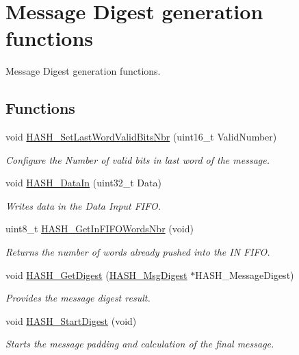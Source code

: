 \hypertarget{group___h_a_s_h___group2}{}\section{Message Digest generation functions}
\label{group___h_a_s_h___group2}


Message Digest generation functions.  


\subsection*{Functions}
\begin{DoxyCompactItemize}
\item 
void \hyperlink{group___h_a_s_h___group2_gac4d1fa51c9240ad0287b371564b5d2a6}{H\+A\+S\+H\+\_\+\+Set\+Last\+Word\+Valid\+Bits\+Nbr} (uint16\+\_\+t Valid\+Number)
\begin{DoxyCompactList}\small\item\em Configure the Number of valid bits in last word of the message. \end{DoxyCompactList}\item 
void \hyperlink{group___h_a_s_h___group2_ga9c4c0cebdeb1ce2631dd2eeab82107ef}{H\+A\+S\+H\+\_\+\+Data\+In} (uint32\+\_\+t Data)
\begin{DoxyCompactList}\small\item\em Writes data in the Data Input F\+I\+F\+O. \end{DoxyCompactList}\item 
uint8\+\_\+t \hyperlink{group___h_a_s_h___group2_ga37bec5e637a57124f3179185d03537ab}{H\+A\+S\+H\+\_\+\+Get\+In\+F\+I\+F\+O\+Words\+Nbr} (void)
\begin{DoxyCompactList}\small\item\em Returns the number of words already pushed into the I\+N F\+I\+F\+O. \end{DoxyCompactList}\item 
void \hyperlink{group___h_a_s_h___group2_ga23018d770837d6ab9f46941f105cc017}{H\+A\+S\+H\+\_\+\+Get\+Digest} (\hyperlink{struct_h_a_s_h___msg_digest}{H\+A\+S\+H\+\_\+\+Msg\+Digest} $\ast$H\+A\+S\+H\+\_\+\+Message\+Digest)
\begin{DoxyCompactList}\small\item\em Provides the message digest result. \end{DoxyCompactList}\item 
void \hyperlink{group___h_a_s_h___group2_ga84ac2b64179fd37b75c4d5f665126e93}{H\+A\+S\+H\+\_\+\+Start\+Digest} (void)
\begin{DoxyCompactList}\small\item\em Starts the message padding and calculation of the final message. \end{DoxyCompactList}\end{DoxyCompactItemize}


